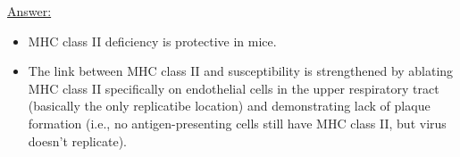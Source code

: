 \documentclass{article}
\newenvironment{QandA}{\begin{enumerate}[label=\bfseries Q\arabic*.]}
                       {\end{enumerate}}
\newenvironment{answered}{\par\normalfont\underline{Answer:}}{}
\begin{document}
\begin{QandA}
\begin{answered}
\begin{itemize}
      \item{MHC class II deficiency is protective in mice.}
      \item{The link between MHC class II and susceptibility is strengthened by ablating MHC class II specifically on endothelial cells in the upper respiratory tract (basically the only replicatibe location) and demonstrating lack of plaque formation (i.e., no antigen-presenting cells still have MHC class II, but virus doesn't replicate).}
    \end{itemize}
    \end{answered}
\end{QandA}
\end{document}
